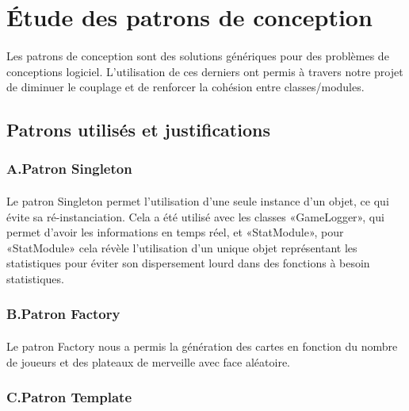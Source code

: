 \documentclass[13pt ,a4paper ]{report}
\begin{document}
\section*{Étude des patrons de conception}    
\begin{multicols}{2} 
      \paragraph{}     
      Les patrons de conception sont des solutions génériques pour des problèmes de conceptions logiciel. L’utilisation de ces derniers ont permis à travers notre projet de diminuer le couplage et de renforcer la cohésion entre classes/modules.
	\subsection{Patrons utilisés et justifications}
		\subsubsection{A.\hspace*{0.5cm}Patron Singleton}
 		\paragraph{}
      		Le patron Singleton permet l’utilisation d’une seule instance d’un objet, ce qui évite sa ré-instanciation. Cela a été utilisé avec les classes «GameLogger», qui permet d'avoir les informations en temps réel, et «StatModule», pour «StatModule» cela révèle l’utilisation d’un unique objet représentant les statistiques pour éviter son dispersement lourd dans des fonctions à besoin statistiques.
      		
		\subsubsection{B.\hspace*{0.5cm}Patron Factory}
		\paragraph{}
      		Le patron Factory nous a permis la génération des cartes en fonction du nombre de joueurs et des plateaux de merveille avec face aléatoire.   
			
		\subsubsection{C.\hspace*{0.5cm}Patron Template}

\end{multicols}
\end{document}
